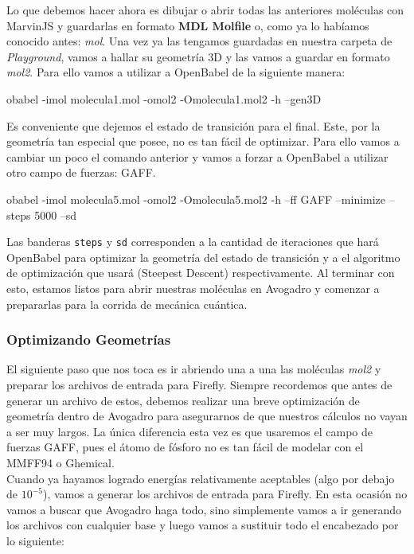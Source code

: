 \documentclass[10pt,letterpaper]{article}
\newcommand{\inlinecode}[1]{
\colorbox{light-gray}{\texttt{#1}}
}
\newenvironment{Code}
{
\begin{lrbox}{\selvestebox}%
\begin{minipage}{\dimexpr\columnwidth-2\fboxsep\relax}
\fontfamily{\ttdefault}\selectfont
}
{\end{minipage}\end{lrbox}%
\begin{center}
\colorbox{light-gray}{\usebox{\selvestebox}}
\end{center}
}
\begin{document}
Lo que debemos hacer ahora es dibujar o abrir todas las anteriores mol\'eculas con MarvinJS y guardarlas en formato \textbf{MDL Molfile} o, como ya lo hab\'iamos conocido antes: \textit{mol}. Una vez ya las tengamos guardadas en nuestra carpeta de \textit{Playground}, vamos a hallar su geometr\'ia 3D y las vamos a guardar en formato \textit{mol2}. Para ello vamos a utilizar a OpenBabel de la siguiente manera:

\begin{Code}
obabel -imol molecula1.mol -omol2 -Omolecula1.mol2 -h --gen3D
\end{Code}

Es conveniente que dejemos el estado de transici\'on para el final. Este, por la geometr\'ia tan especial que posee, no es tan f\'acil de optimizar. Para ello vamos a cambiar un poco el comando anterior y vamos a forzar a OpenBabel a utilizar otro campo de fuerzas: GAFF.

\begin{Code}
obabel -imol molecula5.mol -omol2 -Omolecula5.mol2 -h --ff GAFF --minimize --steps 5000 --sd
\end{Code}

Las banderas \inlinecode{steps} y \inlinecode{sd} corresponden a la cantidad de iteraciones que har\'a OpenBabel para optimizar la geometr\'ia del estado de transici\'on y a el algoritmo de optimizaci\'on que usar\'a (Steepest Descent) respectivamente. Al terminar con esto, estamos listos para abrir nuestras mol\'eculas en Avogadro y comenzar a prepararlas para la corrida de mec\'anica cu\'antica.

\subsubsection{Optimizando Geometr\'ias}

El siguiente paso que nos toca es ir abriendo una a una las mol\'eculas \textit{mol2} y preparar los archivos de entrada para Firefly. Siempre recordemos que antes de generar un archivo de estos, debemos realizar una breve optimizaci\'on de geometr\'ia dentro de Avogadro para asegurarnos de que nuestros c\'alculos no vayan a ser muy largos. La \'unica diferencia esta vez es que usaremos el campo de fuerzas GAFF, pues el \'atomo de f\'osforo no es tan f\'acil de modelar con el MMFF94 o Ghemical.\\

Cuando ya hayamos logrado energ\'ias relativamente aceptables (algo por debajo de $10^{-5}$), vamos a generar los archivos de entrada para Firefly. En esta ocasi\'on no vamos a buscar que Avogadro haga todo, sino simplemente vamos a ir generando los archivos con cualquier base y luego vamos a sustituir todo el encabezado por lo siguiente:
\end{document}
